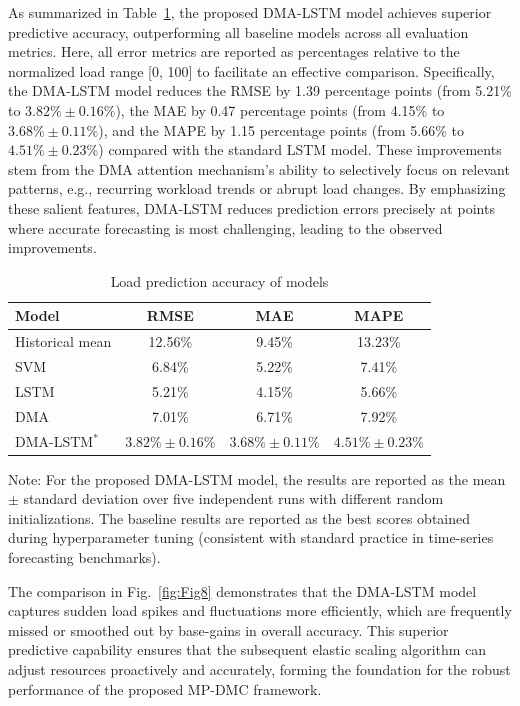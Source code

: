 \documentclass[twoside,twocolumn]{article}
\begin{document}
As summarized in Table~\ref{Table:2}, the proposed DMA-LSTM model achieves superior predictive accuracy, outperforming all baseline models across all evaluation metrics. Here, all error metrics are reported as percentages relative to the normalized load range [0, 100] to facilitate an effective comparison. Specifically, the DMA-LSTM model reduces the RMSE by 1.39 percentage points (from 5.21\% to $3.82\% \pm 0.16\%$), the MAE by 0.47 percentage points (from 4.15\% to $3.68\% \pm 0.11\%$), and the MAPE by 1.15 percentage points (from 5.66\% to $4.51\% \pm 0.23\%$) compared with the standard LSTM model. These improvements stem from the DMA attention mechanism's ability to selectively focus on relevant patterns, e.g., recurring workload trends or abrupt load changes. By emphasizing these salient features, DMA-LSTM reduces prediction errors precisely at points where accurate forecasting is most challenging, leading to the observed improvements.

\begin{table}[htp!]
	\small
	\centering
	\caption{Load prediction accuracy of models}
	\label{Table:2}
	\begin{tabular*}{\columnwidth}{@{\extracolsep{\fill}} lccc}
	\toprule[0.75pt]
	Model & RMSE & MAE & MAPE \\
	\midrule[0.5pt]
	Historical mean & 12.56\% & 9.45\% & 13.23\% \\
	\midrule[0.5pt]
	SVM & 6.84\% & 5.22\% & 7.41\% \\
	\midrule[0.5pt]
	LSTM & 5.21\% & 4.15\% & 5.66\% \\
	\midrule[0.5pt]
	DMA & 7.01\% & 6.71\% & 7.92\% \\
	\midrule[0.5pt]
	DMA-LSTM$^*$ & $3.82\% \pm 0.16\%$ & $3.68\% \pm 0.11\%$ & $4.51\% \pm 0.23\%$ \\
	\bottomrule[0.75pt]
	\end{tabular*}
	\par\vspace{0.5em}
	\parbox{\columnwidth}{\footnotesize Note: For the proposed DMA-LSTM model, the results are reported as the mean $\pm$ standard deviation over five independent runs with different random initializations. The baseline results are reported as the best scores obtained during hyperparameter tuning (consistent with standard practice in time-series forecasting benchmarks).}
	\end{table}

The comparison in Fig.~\ref{fig:Fig8} demonstrates that the DMA-LSTM model captures sudden load spikes and fluctuations more efficiently, which are frequently missed or smoothed out by base-gains in overall accuracy. This superior predictive capability ensures that the subsequent elastic scaling algorithm can adjust resources proactively and accurately, forming the foundation for the robust performance of the proposed MP-DMC framework.
\end{document}
